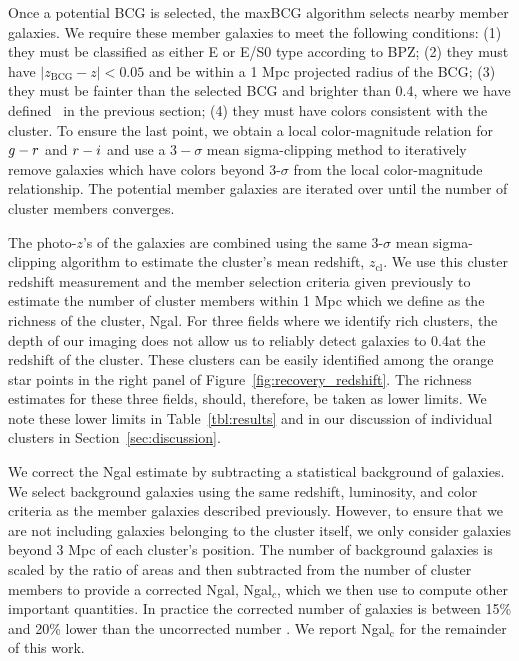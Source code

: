 \documentclass[apj, revtex4-1]{emulateapj}
\begin{document}
Once a potential BCG is selected, the maxBCG algorithm selects nearby member galaxies. We require these member galaxies to meet the following conditions: (1) they must be classified as either E or E/S0 type according to BPZ; (2)  they must have $|z_\mathrm{BCG} - z| < 0.05$ and be within a 1 Mpc projected radius of the BCG; (3) they must be fainter than the selected BCG and brighter than 0.4\lstar, where we have defined \lstar\ in the previous section; (4) they must have colors consistent with the cluster. To ensure the last point, we obtain a local color-magnitude relation for $\hbox{$g$}-\hbox{$r$}$ and $\hbox{$r$}-\hbox{$i$}$ and use a $3-\sigma$ mean sigma-clipping method to iteratively remove galaxies which have colors beyond 3-$\sigma$ from the local color-magnitude relationship. The potential member galaxies are iterated over until the number of cluster members converges.

The photo-$z$'s of the galaxies are combined using the same 3-$\sigma$ mean sigma-clipping algorithm to estimate the cluster's mean redshift, $z_\mathrm{cl}$. We use this cluster redshift measurement and the member selection criteria given previously to estimate the number of cluster members within 1 Mpc which we define as the richness  of the cluster, Ngal. For three fields where we identify rich clusters, the depth of our imaging does not allow us to reliably detect galaxies to 0.4\lstar at the redshift of the cluster. These clusters can be easily identified among the orange star points in the right panel of Figure~\ref{fig:recovery_redshift}. The richness estimates for these three fields, should, therefore, be taken as lower limits. We note these lower limits in Table~\ref{tbl:results} and in our discussion of individual clusters in Section~\ref{sec:discussion}.

We correct the Ngal estimate by subtracting a statistical background of galaxies. We select background galaxies using the same redshift, luminosity, and color criteria as the member galaxies described previously. However, to ensure that we are not including galaxies belonging to the cluster itself, we only consider galaxies beyond 3 Mpc of each cluster's position. The number of background galaxies is scaled by the ratio of areas and then subtracted from the number of cluster members to provide a corrected Ngal, Ngal$_c$, which we then use to compute other important quantities. In practice the corrected number of galaxies is between 15\% and 20\% lower than the uncorrected number \citep{Menanteau2010}. We report Ngal$_\mathrm{c}$ for the remainder of this work.
\end{document}
